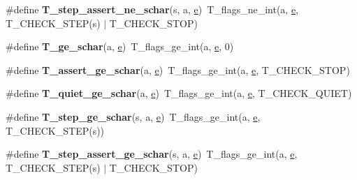 \begin{DoxyCompactItemize}
\#define {\bfseries T\+\_\+step\+\_\+assert\+\_\+ne\+\_\+schar}(s,  a,  \mbox{\hyperlink{sun4u_2tte_8h_a8b0b9ed08e0e18920ec2682f48228c27}{e}})~T\+\_\+flags\+\_\+ne\+\_\+int(a, \mbox{\hyperlink{sun4u_2tte_8h_a8b0b9ed08e0e18920ec2682f48228c27}{e}}, T\+\_\+\+C\+H\+E\+C\+K\+\_\+\+S\+T\+EP(s) $\vert$ T\+\_\+\+C\+H\+E\+C\+K\+\_\+\+S\+T\+OP)
\item 
\mbox{\label{group__RTEMSTestFrameworkChecksSChar_ga7fc51aa0b18d5e6de59e1411001b5fe3}} 
\#define {\bfseries T\+\_\+ge\+\_\+schar}(a,  \mbox{\hyperlink{sun4u_2tte_8h_a8b0b9ed08e0e18920ec2682f48228c27}{e}})~T\+\_\+flags\+\_\+ge\+\_\+int(a, \mbox{\hyperlink{sun4u_2tte_8h_a8b0b9ed08e0e18920ec2682f48228c27}{e}}, 0)
\item 
\mbox{\label{group__RTEMSTestFrameworkChecksSChar_ga1139ad558348f90c6bf13e9efc08db11}} 
\#define {\bfseries T\+\_\+assert\+\_\+ge\+\_\+schar}(a,  \mbox{\hyperlink{sun4u_2tte_8h_a8b0b9ed08e0e18920ec2682f48228c27}{e}})~T\+\_\+flags\+\_\+ge\+\_\+int(a, \mbox{\hyperlink{sun4u_2tte_8h_a8b0b9ed08e0e18920ec2682f48228c27}{e}}, T\+\_\+\+C\+H\+E\+C\+K\+\_\+\+S\+T\+OP)
\item 
\mbox{\label{group__RTEMSTestFrameworkChecksSChar_ga019635f3cab3f53c022e2b15e88eb316}} 
\#define {\bfseries T\+\_\+quiet\+\_\+ge\+\_\+schar}(a,  \mbox{\hyperlink{sun4u_2tte_8h_a8b0b9ed08e0e18920ec2682f48228c27}{e}})~T\+\_\+flags\+\_\+ge\+\_\+int(a, \mbox{\hyperlink{sun4u_2tte_8h_a8b0b9ed08e0e18920ec2682f48228c27}{e}}, T\+\_\+\+C\+H\+E\+C\+K\+\_\+\+Q\+U\+I\+ET)
\item 
\mbox{\label{group__RTEMSTestFrameworkChecksSChar_ga3eaad9ced79f1d74f83568e3f74cff54}} 
\#define {\bfseries T\+\_\+step\+\_\+ge\+\_\+schar}(s,  a,  \mbox{\hyperlink{sun4u_2tte_8h_a8b0b9ed08e0e18920ec2682f48228c27}{e}})~T\+\_\+flags\+\_\+ge\+\_\+int(a, \mbox{\hyperlink{sun4u_2tte_8h_a8b0b9ed08e0e18920ec2682f48228c27}{e}}, T\+\_\+\+C\+H\+E\+C\+K\+\_\+\+S\+T\+EP(s))
\item 
\mbox{\label{group__RTEMSTestFrameworkChecksSChar_gab10b462a40e3dd5ecc978cfe63568bd2}} 
\#define {\bfseries T\+\_\+step\+\_\+assert\+\_\+ge\+\_\+schar}(s,  a,  \mbox{\hyperlink{sun4u_2tte_8h_a8b0b9ed08e0e18920ec2682f48228c27}{e}})~T\+\_\+flags\+\_\+ge\+\_\+int(a, \mbox{\hyperlink{sun4u_2tte_8h_a8b0b9ed08e0e18920ec2682f48228c27}{e}}, T\+\_\+\+C\+H\+E\+C\+K\+\_\+\+S\+T\+EP(s) $\vert$ T\+\_\+\+C\+H\+E\+C\+K\+\_\+\+S\+T\+OP)

\end{DoxyCompactItemize}
